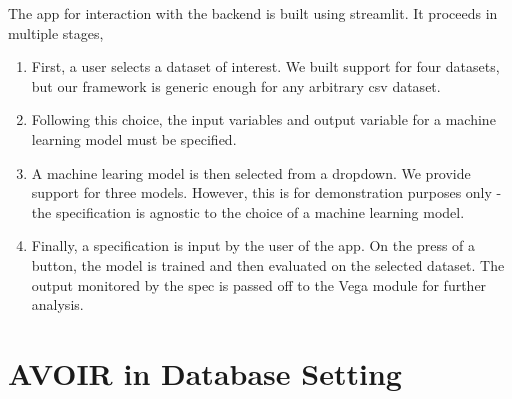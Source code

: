 \begin{subappendices}
The app for interaction with the backend is built using streamlit. It proceeds in multiple stages,
\begin{enumerate}
    \item First, a user selects a dataset of interest. We built support for four datasets, but our framework is generic enough for any arbitrary csv dataset.
    \item Following this choice, the input variables and output variable for a machine learning model must be specified.
    \item A machine learing model is then selected from a dropdown. We provide support for three models. However, this is for demonstration purposes only - the specification is agnostic to the choice of a machine learning model.
    \item Finally, a specification is input by the user of the app. On the press of a button, the model is trained and then evaluated on the selected dataset. The output monitored by the spec is passed off to the Vega module for further analysis.
\end{enumerate}

\section{AVOIR in Database Setting}

\end{subappendices}
